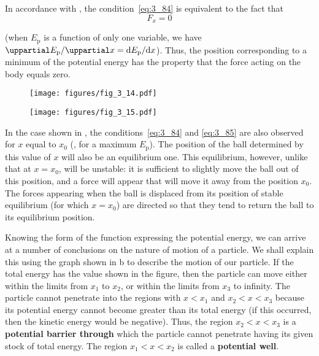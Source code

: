 \noindent
In accordance with , the condition~\eqref{eq:3_84} is equivalent to the fact that
\begin{equation}\label{eq:3_85}
F_x = 0
\end{equation}

\noindent
(when $E_{\text{p}}$ is a function of only one variable, we have $\diffinpartial{E_{\text{p}}}{x}=\diffin{E_{\text{p}}}{x}$). Thus, the position corresponding to a minimum of the potential energy has the property that the force acting on the body equals zero.

\begin{figure}[t]
	\begin{minipage}[t]{0.5\linewidth}
		\begin{center}
			\texttt{[image: figures/fig\_3\_14.pdf]}
			\caption[]{}
			\label{fig:3_14}
		\end{center}
	\end{minipage}
	\hspace{-0.05cm}
	\begin{minipage}[t]{0.5\linewidth}
		\begin{center}
			\texttt{[image: figures/fig\_3\_15.pdf]}
			\caption[]{}
			\label{fig:3_15}
		\end{center}
	\end{minipage}
	\vspace{-0.5cm}
\end{figure}

In the case shown in , the conditions~\eqref{eq:3_84} and \eqref{eq:3_85} are also observed for $x$ equal to $x_0$ (\ie, for a maximum $E_{\text{p}}$). The position of the ball determined by this value of $x$ will also be an equilibrium one. This equilibrium, however, unlike that at $x=x_0$, will be unstable: it is sufficient to slightly move the ball out of this position, and a force will appear that will move it away from the position $x_0$. The forces appearing when the ball is displaced from its position of stable equilibrium (for which $x=x_0$) are directed so that they tend to return the ball to its equilibrium position.

Knowing the form of the function expressing the potential energy, we can arrive at a number of conclusions on the nature of motion of a particle. We shall explain this using the graph shown in b to describe the motion of our particle. If the total energy has the value shown in the figure, then the particle can move either within the limits from $x_1$ to $x_2$, or within the limits from $x_3$ to infinity. The particle cannot penetrate into the regions with $x<x_1$ and $x_2<x<x_3$ because its potential energy cannot become greater than its total energy (if this occurred, then the kinetic energy would be negative). Thus, the region $x_2<x<x_3$ is a \textbf{potential barrier through} which the particle cannot penetrate having its given stock of total energy. The region $x_1<x<x_2$ is called a \textbf{potential well}.

